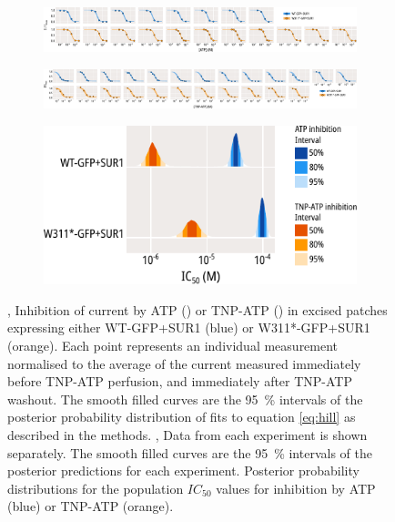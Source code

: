 \begin{figure}[h]
\begin{subfigure}[t]{0.45\textwidth}
	\end{subfigure}
	\vfill
	\begin{subfigure}[t]{0.9\textwidth}
		\caption{}\label{ch3fig:atp_inhibition_2}
		\centering
		\includegraphics[width=\textwidth]{atp_inhibition_2.pdf}
	\end{subfigure}
	\vfill
	\begin{subfigure}[t]{0.9\textwidth}
		\caption{}\label{ch3fig:tnpatp_inhibition_2}
		\centering
		\includegraphics[width=\textwidth]{tnpatp_inhibition_2.pdf}
	\end{subfigure}
	\vfill
	\begin{subfigure}[t]{0.6\textwidth}
		\caption{}\label{ch3fig:ec50_fits_1}
		\centering
		\includegraphics[width=\textwidth]{ec50_fits_1.pdf}
	\end{subfigure}
	\caption[WT-GFP and W311*-GFP electrophysiology]{
	,  Inhibition of current by ATP () or TNP-ATP () in excised patches expressing either WT-GFP+SUR1 (blue) or W311*-GFP+SUR1 (orange).
	Each point represents an individual measurement normalised to the average of the current measured immediately before TNP-ATP perfusion, and immediately after TNP-ATP washout.
	The smooth filled curves are the \SI{95}{\percent} intervals of the posterior probability distribution of fits to equation \ref{eq:hill} as described in the methods.
	,  Data from each experiment is shown separately.
	The smooth filled curves are the \SI{95}{\percent} intervals of the posterior predictions for each experiment.
	 Posterior probability distributions for the population $IC_{50}$ values for inhibition by ATP (blue) or TNP-ATP (orange).
	}
\end{figure}

